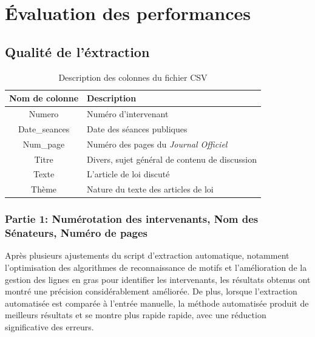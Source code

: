 \section{Évaluation des performances}

\subsection{Qualité de l’éxtraction}


\begin{table}[ht!]
\centering
\begin{tabular}{|c|p{8cm}|}
\hline
\textbf{Nom de colonne} & \textbf{Description} \\
\hline
Numero & Numéro d'intervenant \\
\hline
Date\_seances & Date des séances publiques \\
\hline
Num\_page & Numéro des pages du \textit{Journal Officiel} \\
\hline
Titre & Divers, sujet général de contenu de discussion \\
\hline
Texte & L'article de loi discuté \\
\hline
Thème & Nature du texte des articles de loi \\
\hline
\end{tabular}
\caption{Description des colonnes du fichier CSV}
\label{table:description_csv}
\end{table}


\subsubsection{Partie 1: Numérotation des intervenants, Nom des Sénateurs, Numéro de pages}

Après plusieurs ajustements du script d'extraction automatique, notamment l'optimisation des algorithmes de reconnaissance de motifs et l'amélioration de la gestion des lignes en gras pour identifier les intervenants, les résultats obtenus ont montré une précision considérablement améliorée. De plus, lorsque l'extraction automatisée est comparée à l'entrée manuelle, la méthode automatisée produit de meilleurs résultats et se montre plus rapide rapide, avec une réduction significative des erreurs.

